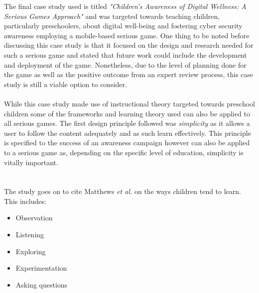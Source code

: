 \documentclass[conference]{IEEEtran}
\begin{document}
The final case study used is titled \textit{"Children’s Awareness of Digital Wellness: A Serious Games Approach"} and was targeted towards teaching children, particularly preschoolers, about digital well-being and fostering cyber security awareness employing a mobile-based serious game\cite{allers2021children}. One thing to be noted before discussing this case study is that it focused on the design and research needed for such a serious game and stated that future work could include the development and deployment of the game\cite{allers2021children}. Nonetheless, due to the level of planning done for the game as well as the positive outcome from an expert review process, this case study is still a viable option to consider. 
\\\\
While this case study\cite{allers2021children} made use of instructional theory targeted towards preschool children\cite{matthews2007,callaghan2018} some of the frameworks and learning theory used can also be applied to all serious games. The first design principle followed was \textit{simplicity} as it allows a user to follow the content adequately and as such learn effectively\cite{allers2021children}. This principle is specified to the success of an awareness campaign however can also be applied to a serious game as, depending on the specific level of education, simplicity is vitally important. 
\\\\\\
The study goes on to cite Matthews \textit{et al.}\cite{matthews2007} on the ways children tend to learn. This includes:
\begin{itemize}
\item Observation
\item Listening
\item Exploring
\item Experimentation
\item Asking questions
\end{itemize}
\end{document}
